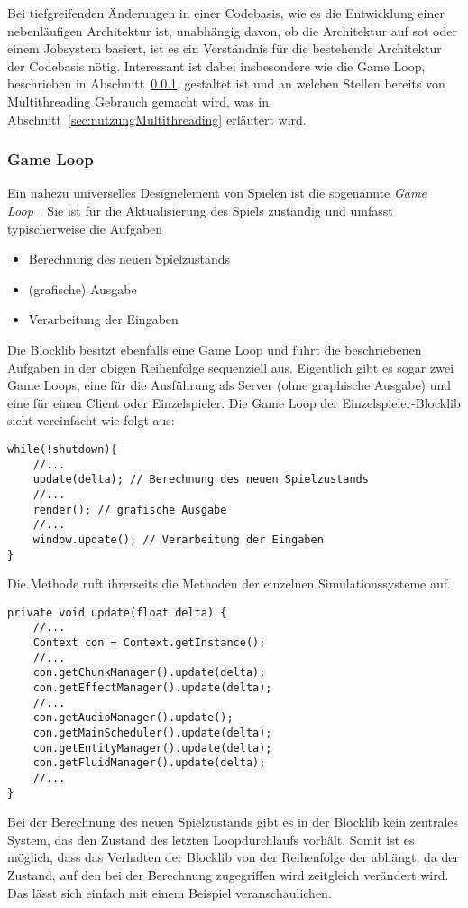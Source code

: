 Bei tiefgreifenden Änderungen in einer Codebasis, wie es die Entwicklung einer nebenläufigen Architektur ist, unabhängig davon, ob die Architektur auf \ac{sot} oder einem Jobsystem basiert, ist es ein Verständnis für die bestehende Architektur der Codebasis nötig. Interessant ist dabei insbesondere wie die Game Loop, beschrieben in Abschnitt~\ref{sec:gameLoop}, gestaltet ist und an welchen Stellen bereits von Multithreading Gebrauch gemacht wird, was in Abschnitt~\ref{sec:nutzungMultithreading} erläutert wird.

\subsubsection{Game Loop}\label{sec:gameLoop}
Ein nahezu universelles Designelement von Spielen ist die sogenannte \emph{Game Loop}~\cite[S.~161~ff.]{Nystrom2015}. Sie ist für die Aktualisierung des Spiels zuständig und umfasst typischerweise die Aufgaben 
\begin{itemize}
  \item Berechnung des neuen Spielzustands
  \item (grafische) Ausgabe
  \item Verarbeitung der Eingaben
\end{itemize}
Die Blocklib besitzt ebenfalls eine Game Loop und führt die beschriebenen Aufgaben in der obigen Reihenfolge sequenziell aus. Eigentlich gibt es sogar zwei Game Loops, eine für die Ausführung als Server (ohne graphische Ausgabe) und eine für einen Client oder Einzelspieler. Die Game Loop der Einzelspieler-Blocklib sieht vereinfacht wie folgt aus:
\begin{lstlisting}
while(!shutdown){
	//...
	update(delta); // Berechnung des neuen Spielzustands
	//...
	render(); // grafische Ausgabe
	//...
	window.update(); // Verarbeitung der Eingaben
}
\end{lstlisting}

Die Methode  ruft ihrerseits die  Methoden der einzelnen Simulationssysteme auf.
\begin{lstlisting}
private void update(float delta) {
	//...
	Context con = Context.getInstance();
	//...
	con.getChunkManager().update(delta);
	con.getEffectManager().update(delta);
	//...
	con.getAudioManager().update();
	con.getMainScheduler().update(delta);
	con.getEntityManager().update(delta);
	con.getFluidManager().update(delta);
	//...
}
\end{lstlisting}
Bei der Berechnung des neuen Spielzustands gibt es in der Blocklib kein zentrales System, das den Zustand des letzten Loopdurchlaufs vorhält. Somit ist es möglich, dass das Verhalten der Blocklib von der Reihenfolge der  abhängt, da der Zustand, auf den bei der Berechnung zugegriffen wird zeitgleich verändert wird. Das lässt sich einfach mit einem Beispiel veranschaulichen. 

